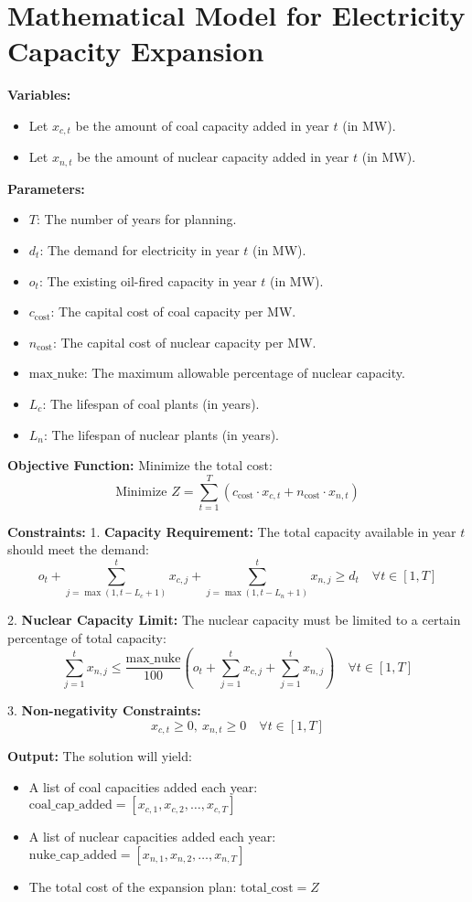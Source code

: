\documentclass{article}
\begin{document}
\section*{Mathematical Model for Electricity Capacity Expansion}

\textbf{Variables:}
\begin{itemize}
    \item Let \( x_{c,t} \) be the amount of coal capacity added in year \( t \) (in MW).
    \item Let \( x_{n,t} \) be the amount of nuclear capacity added in year \( t \) (in MW).
\end{itemize}

\textbf{Parameters:}
\begin{itemize}
    \item \( T \): The number of years for planning.
    \item \( d_t \): The demand for electricity in year \( t \) (in MW).
    \item \( o_t \): The existing oil-fired capacity in year \( t \) (in MW).
    \item \( c_{\text{cost}} \): The capital cost of coal capacity per MW.
    \item \( n_{\text{cost}} \): The capital cost of nuclear capacity per MW.
    \item \( \text{max\_nuke} \): The maximum allowable percentage of nuclear capacity.
    \item \( L_c \): The lifespan of coal plants (in years).
    \item \( L_n \): The lifespan of nuclear plants (in years).
\end{itemize}

\textbf{Objective Function:}
Minimize the total cost:
\[
\text{Minimize } Z = \sum_{t=1}^{T} \left( c_{\text{cost}} \cdot x_{c,t} + n_{\text{cost}} \cdot x_{n,t} \right)
\]

\textbf{Constraints:}
1. \textbf{Capacity Requirement:}
   The total capacity available in year \( t \) should meet the demand:
   \[
   o_t + \sum_{j=\max(1, t-L_c+1)}^{t} x_{c,j} + \sum_{j=\max(1, t-L_n+1)}^{t} x_{n,j} \geq d_t \quad \forall t \in [1, T]
   \]

2. \textbf{Nuclear Capacity Limit:}
   The nuclear capacity must be limited to a certain percentage of total capacity:
   \[
   \sum_{j=1}^{t} x_{n,j} \leq \frac{\text{max\_nuke}}{100} \left( o_t + \sum_{j=1}^{t} x_{c,j} + \sum_{j=1}^{t} x_{n,j} \right) \quad \forall t \in [1, T]
   \]

3. \textbf{Non-negativity Constraints:}
   \[
   x_{c,t} \geq 0,\ x_{n,t} \geq 0 \quad \forall t \in [1, T]
   \]

\textbf{Output:}
The solution will yield:
\begin{itemize}
    \item A list of coal capacities added each year: \( \text{coal\_cap\_added} = [x_{c,1}, x_{c,2}, \ldots, x_{c,T}] \)
    \item A list of nuclear capacities added each year: \( \text{nuke\_cap\_added} = [x_{n,1}, x_{n,2}, \ldots, x_{n,T}] \)
    \item The total cost of the expansion plan: \( \text{total\_cost} = Z \)
\end{itemize}
\end{document}
